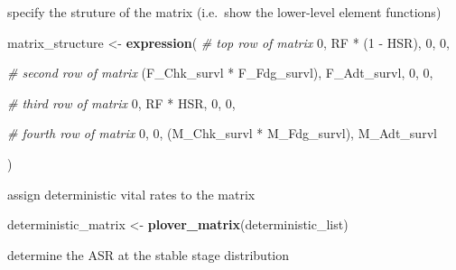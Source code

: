 \documentclass[]{article}
\newenvironment{Shaded}{\begin{snugshade}}{\end{snugshade}}
\newcommand{\KeywordTok}[1]{\textcolor[rgb]{0.13,0.29,0.53}{\textbf{{#1}}}}
\newcommand{\DataTypeTok}[1]{\textcolor[rgb]{0.13,0.29,0.53}{{#1}}}
\newcommand{\DecValTok}[1]{\textcolor[rgb]{0.00,0.00,0.81}{{#1}}}
\newcommand{\StringTok}[1]{\textcolor[rgb]{0.31,0.60,0.02}{{#1}}}
\newcommand{\CommentTok}[1]{\textcolor[rgb]{0.56,0.35,0.01}{\textit{{#1}}}}
\newcommand{\NormalTok}[1]{{#1}}
\begin{document}
specify the struture of the matrix (i.e.~show the lower-level element
functions)

\begin{Shaded}
\begin{Highlighting}[]
\NormalTok{matrix_structure <-}\StringTok{ }\KeywordTok{expression}\NormalTok{(}
                               \CommentTok{# top row of matrix}
                               \DecValTok{0}\NormalTok{, RF *}\StringTok{ }\NormalTok{(}\DecValTok{1} \NormalTok{-}\StringTok{ }\NormalTok{HSR), }\DecValTok{0}\NormalTok{, }\DecValTok{0}\NormalTok{,}
                               
                               \CommentTok{# second row of matrix}
                               \NormalTok{(F_Chk_survl *}\StringTok{ }\NormalTok{F_Fdg_survl), F_Adt_survl, }\DecValTok{0}\NormalTok{, }\DecValTok{0}\NormalTok{,}
                               
                               \CommentTok{# third row of matrix}
                               \DecValTok{0}\NormalTok{, RF *}\StringTok{ }\NormalTok{HSR, }\DecValTok{0}\NormalTok{, }\DecValTok{0}\NormalTok{,}
                               
                               \CommentTok{# fourth row of matrix}
                               \DecValTok{0}\NormalTok{, }\DecValTok{0}\NormalTok{, (M_Chk_survl *}\StringTok{ }\NormalTok{M_Fdg_survl), M_Adt_survl}
                               
                               \NormalTok{)}
\end{Highlighting}
\end{Shaded}

assign deterministic vital rates to the matrix

\begin{Shaded}
\begin{Highlighting}[]
\NormalTok{deterministic_matrix <-}\StringTok{ }\KeywordTok{plover_matrix}\NormalTok{(deterministic_list)}
\end{Highlighting}
\end{Shaded}

determine the ASR at the stable stage distribution

\begin{Shaded}
\end{Shaded}
\end{document}
